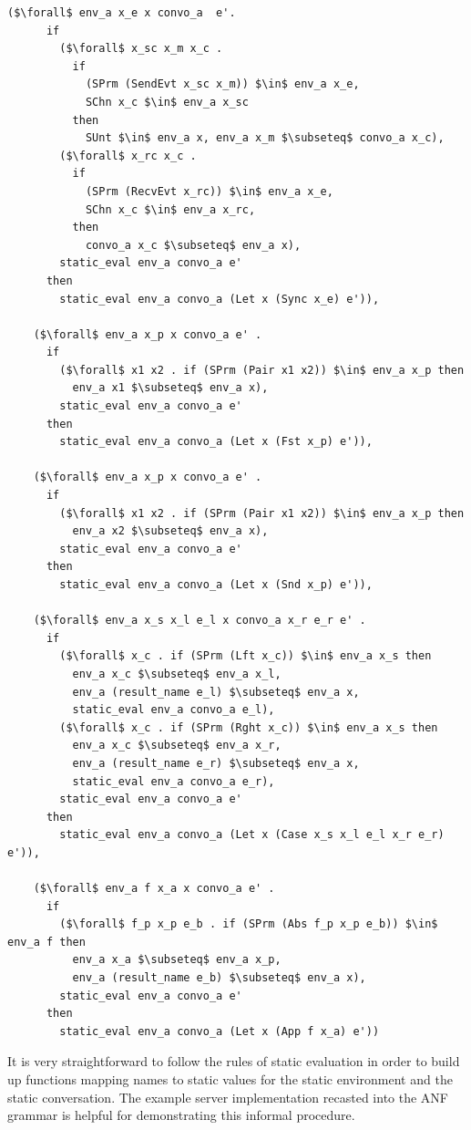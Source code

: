 \documentclass{article}
\begin{document}
\begin{lstlisting}[language=logic, mathescape]
    ($\forall$ env_a x_e x convo_a  e'.
      if
        ($\forall$ x_sc x_m x_c . 
          if
            (SPrm (SendEvt x_sc x_m)) $\in$ env_a x_e, 
            SChn x_c $\in$ env_a x_sc 
          then
            SUnt $\in$ env_a x, env_a x_m $\subseteq$ convo_a x_c),
        ($\forall$ x_rc x_c . 
          if
            (SPrm (RecvEvt x_rc)) $\in$ env_a x_e,
            SChn x_c $\in$ env_a x_rc, 
          then
            convo_a x_c $\subseteq$ env_a x),
        static_eval env_a convo_a e'
      then
        static_eval env_a convo_a (Let x (Sync x_e) e')),

    ($\forall$ env_a x_p x convo_a e' . 
      if
        ($\forall$ x1 x2 . if (SPrm (Pair x1 x2)) $\in$ env_a x_p then
          env_a x1 $\subseteq$ env_a x),
        static_eval env_a convo_a e'
      then
        static_eval env_a convo_a (Let x (Fst x_p) e')),

    ($\forall$ env_a x_p x convo_a e' . 
      if
        ($\forall$ x1 x2 . if (SPrm (Pair x1 x2)) $\in$ env_a x_p then
          env_a x2 $\subseteq$ env_a x),
        static_eval env_a convo_a e'
      then
        static_eval env_a convo_a (Let x (Snd x_p) e')),

    ($\forall$ env_a x_s x_l e_l x convo_a x_r e_r e' . 
      if
        ($\forall$ x_c . if (SPrm (Lft x_c)) $\in$ env_a x_s then 
          env_a x_c $\subseteq$ env_a x_l,
          env_a (result_name e_l) $\subseteq$ env_a x,
          static_eval env_a convo_a e_l),
        ($\forall$ x_c . if (SPrm (Rght x_c)) $\in$ env_a x_s then 
          env_a x_c $\subseteq$ env_a x_r, 
          env_a (result_name e_r) $\subseteq$ env_a x, 
          static_eval env_a convo_a e_r),
        static_eval env_a convo_a e'
      then
        static_eval env_a convo_a (Let x (Case x_s x_l e_l x_r e_r) e')),

    ($\forall$ env_a f x_a x convo_a e' . 
      if
        ($\forall$ f_p x_p e_b . if (SPrm (Abs f_p x_p e_b)) $\in$ env_a f then 
          env_a x_a $\subseteq$ env_a x_p, 
          env_a (result_name e_b) $\subseteq$ env_a x),
        static_eval env_a convo_a e'
      then
        static_eval env_a convo_a (Let x (App f x_a) e'))
  \end{lstlisting}

It is very straightforward to follow the rules of static evaluation in order to build up
functions mapping names to static values for the static environment and the static conversation.
The example server implementation recasted into the ANF grammar is helpful for demonstrating this
informal procedure.
\end{document}
